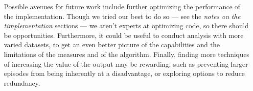 Possible avenues for future work include further optimizing the performance of the implementation. Though we tried our best to do so --- see the \emph{notes on the timplementation} sections --- we aren't experts at optimizing code, so there should be opportunities. Furthermore, it could be useful to conduct analysis with more varied datasets, to get an even better picture of the capabilities and the limitations of the measures and of the algorithm. Finally, finding more techniques of increasing the value of the output may be rewarding, such as preventing larger episodes from being inherently at a disadvantage, or exploring options to reduce redundancy.
